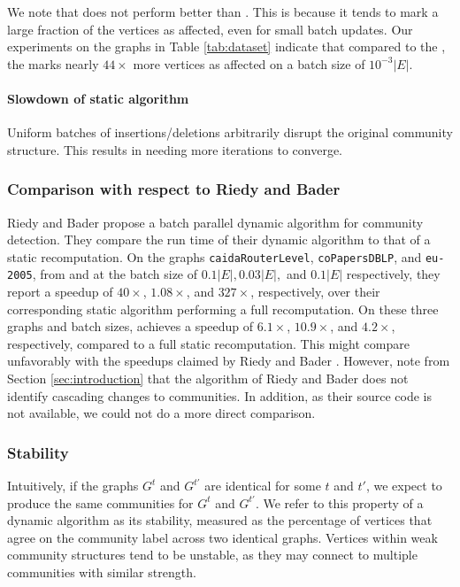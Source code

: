 We note that \DelLou{} does not perform better than \NaiLou{}. This is because it tends to mark a large fraction of the vertices as affected, even for small batch updates. Our experiments on the graphs in Table \ref{tab:dataset} indicate that compared to the \FroLou{}, the \DelLou{} marks nearly $44\times$ more vertices as affected on a batch size of $10^{-3} |E|$.

\paragraph{Slowdown of static algorithm}

Uniform batches of insertions/deletions arbitrarily disrupt the original community structure. This results in \StaLou{} needing more iterations to converge.


\subsubsection{Comparison with respect to Riedy and Bader \cite{com-riedy13}}

Riedy and Bader propose a batch parallel dynamic algorithm for community detection. They compare the run time of their dynamic algorithm to that of a static recomputation. On the graphs \verb|caidaRouterLevel|, \verb|coPapersDBLP|, and \verb|eu-2005|, from \cite{com-riedy13} and at the batch size of $0.1|E|, 0.03|E|,$ and $0.1|E|$ respectively, they report a speedup of $40\times$, $1.08\times$, and $327\times$, respectively, over their corresponding static algorithm performing a full recomputation. On these three graphs and batch sizes, \FroLou{} achieves a speedup of $6.1\times$, $10.9\times$, and $4.2\times$, respectively, compared to a full static recomputation. This might compare unfavorably with the speedups claimed by Riedy and Bader \cite{com-riedy13}. However, note from Section \ref{sec:introduction} that the algorithm of Riedy and Bader \cite{com-riedy13} does not identify cascading changes to communities. In addition, as their source code is not available, we could not do a more direct comparison.


\subsubsection{Stability}
\label{sec:louvain-stability}

Intuitively, if the graphs $G^t$ and $G^{t'}$ are identical for some $t$ and $t'$, we expect \FroLou{} to produce the same communities for $G^t$ and $G^{t'}$. We refer to this property of a dynamic algorithm as its stability, measured as the percentage of vertices that agree on the community label across two identical graphs. Vertices within weak community structures tend to be unstable, as they may connect to multiple communities with similar strength.

